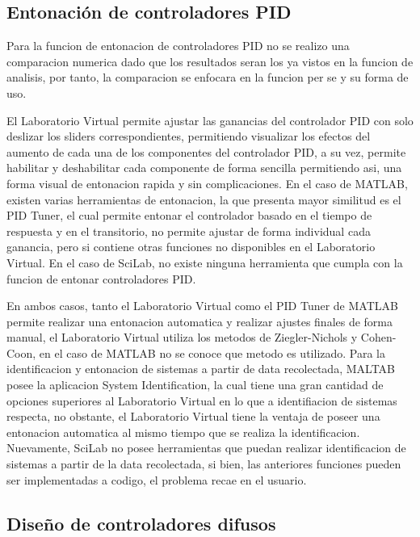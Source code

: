     \subsection{Entonación de controladores PID}
        
        Para la funcion de entonacion de controladores PID no se realizo una comparacion numerica dado que los resultados seran los ya vistos en la funcion de analisis, por tanto, la comparacion se enfocara en la funcion per se y su forma de uso.

        El Laboratorio Virtual permite ajustar las ganancias del controlador PID con solo deslizar los sliders correspondientes, permitiendo visualizar los efectos del aumento de cada una de los componentes del controlador PID, a su vez, permite habilitar y deshabilitar cada componente de forma sencilla permitiendo asi, una forma visual de entonacion rapida y sin complicaciones. En el caso de MATLAB, existen varias herramientas de entonacion, la que presenta mayor similitud es el PID Tuner, el cual permite entonar el controlador basado en el tiempo de respuesta y en el transitorio, no permite ajustar de forma individual cada ganancia, pero si contiene otras funciones no disponibles en el Laboratorio Virtual. En el caso de SciLab, no existe ninguna herramienta que cumpla con la funcion de entonar controladores PID.

        En ambos casos, tanto el Laboratorio Virtual como el PID Tuner de MATLAB permite realizar una entonacion automatica y realizar ajustes finales de forma manual, el Laboratorio Virtual utiliza los metodos de Ziegler-Nichols y Cohen-Coon, en el caso de MATLAB no se conoce que metodo es utilizado. Para la identificacion y entonacion de sistemas a partir de data recolectada, MALTAB posee la aplicacion System Identification, la cual tiene una gran cantidad de opciones superiores al Laboratorio Virtual en lo que a identifiacion de sistemas respecta, no obstante, el Laboratorio Virtual tiene la ventaja de poseer una entonacion automatica al mismo tiempo que se realiza la identificacion. Nuevamente, SciLab no posee herramientas que puedan realizar identificacion de sistemas a partir de la data recolectada, si bien, las anteriores funciones pueden ser implementadas a codigo, el problema recae en el usuario.

    \subsection{Diseño de controladores difusos}

